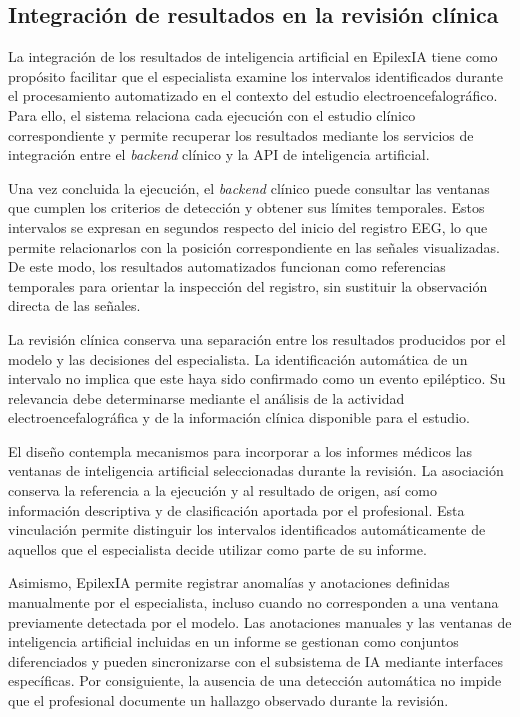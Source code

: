 \subsection{Integración de resultados en la revisión clínica}
\label{subsec:integracion-resultados-revision-clinica}

La integración de los resultados de inteligencia artificial en EpilexIA tiene como propósito facilitar que el especialista examine los intervalos identificados durante el procesamiento automatizado en el contexto del estudio electroencefalográfico. Para ello, el sistema relaciona cada ejecución con el estudio clínico correspondiente y permite recuperar los resultados mediante los servicios de integración entre el \textit{backend} clínico y la API de inteligencia artificial.

Una vez concluida la ejecución, el \textit{backend} clínico puede consultar las ventanas que cumplen los criterios de detección y obtener sus límites temporales. Estos intervalos se expresan en segundos respecto del inicio del registro EEG, lo que permite relacionarlos con la posición correspondiente en las señales visualizadas. De este modo, los resultados automatizados funcionan como referencias temporales para orientar la inspección del registro, sin sustituir la observación directa de las señales.

La revisión clínica conserva una separación entre los resultados producidos por el modelo y las decisiones del especialista. La identificación automática de un intervalo no implica que este haya sido confirmado como un evento epiléptico. Su relevancia debe determinarse mediante el análisis de la actividad electroencefalográfica y de la información clínica disponible para el estudio.

El diseño contempla mecanismos para incorporar a los informes médicos las ventanas de inteligencia artificial seleccionadas durante la revisión. La asociación conserva la referencia a la ejecución y al resultado de origen, así como información descriptiva y de clasificación aportada por el profesional. Esta vinculación permite distinguir los intervalos identificados automáticamente de aquellos que el especialista decide utilizar como parte de su informe.

Asimismo, EpilexIA permite registrar anomalías y anotaciones definidas manualmente por el especialista, incluso cuando no corresponden a una ventana previamente detectada por el modelo. Las anotaciones manuales y las ventanas de inteligencia artificial incluidas en un informe se gestionan como conjuntos diferenciados y pueden sincronizarse con el subsistema de IA mediante interfaces específicas. Por consiguiente, la ausencia de una detección automática no impide que el profesional documente un hallazgo observado durante la revisión.

